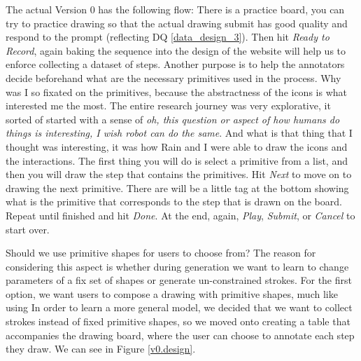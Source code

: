 The actual Version 0 has the following flow:
There is a practice board, you can try to practice drawing so that the actual drawing submit has good quality and respond to the prompt (reflecting DQ \ref{data_design_3}). Then hit \textit{Ready to Record}, again baking the sequence into the design of the website will help us to enforce collecting a dataset of steps. Another purpose is to help the annotators decide beforehand what are the necessary primitives used in the process. Why was I so fixated on the primitives, because the abstractness of the icons is what interested me the most. The entire research journey was very explorative, it sorted of started with a sense of \textit{oh, this question or aspect of how humans do things is interesting, I wish robot can do the same}. And what is that thing that I thought was interesting, it was how Rain and I were able to draw the icons and the interactions. 
The first thing you will do is select a primitive from a list, and then you will draw the step that contains the primitives. Hit \textit{Next} to move on to drawing the next primitive. There are will be a little tag at the bottom showing what is the primitive that corresponds to the step that is drawn on the board. Repeat until finished and hit \textit{Done}. At the end, again, \textit{Play}, \textit{Submit}, or \textit{Cancel} to start over. 

{\color{red} } Should we use primitive shapes for users to choose from? 
The reason for considering this aspect is whether during generation we want to learn to change parameters of a fix set of shapes or generate un-constrained strokes. For the first option, we want users to compose a drawing with primitive shapes, much like using   
In order to learn a more general model, we decided that we want to collect strokes instead of fixed primitive shapes, so we moved onto creating a table that accompanies the drawing board, where the user can choose to annotate each step they draw. We can see in Figure \ref{v0.design}.

